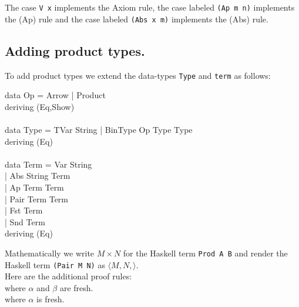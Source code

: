 \documentclass[11pt]{article}
\begin{document}
The case {\tt{V x}} implements the Axiom rule, the case labeled {\tt{(Ap m
n)}} implements the (Ap) rule and the case labeled {\tt{(Abs x m)}} implements
the (Abs) rule.


\subsection{Adding product types.}

To add product types  we extend the data-types {\tt{Type}} and {\tt{term}} as follows:

\begin{program*}
\> data Op = Arrow | Product  \\
\>         deriving (Eq,Show) \\
\> \\
\> data  Type =   TVar  String |  BinType Op  Type   Type \\
\>         deriving (Eq) \\
\> \\
\> data  Term =   Var String \\ 
\>              | Abs  String Term   \\
\>              | Ap Term Term   \\
\>              | Pair Term Term  \\
\>              | Fst Term  \\
\>              | Snd Term \\
\>        deriving (Eq) \\
\end{program*}

Mathematically we write $M\times{}N$ for the Haskell term {\tt{Prod A B}} and
render the Haskell term {\tt{(Pair M N)}} as $\langle{}M,N,\rangle$.
\ \\
Here are the additional proof rules:
\vspace{.125in}\\

{\hspace{.25in}} where $\alpha$ and $\beta$ are fresh.
\vspace{.125in}\\

{\hspace{.25in}} where $\alpha$ is fresh.
\vspace{.125in}\\
\end{document}
